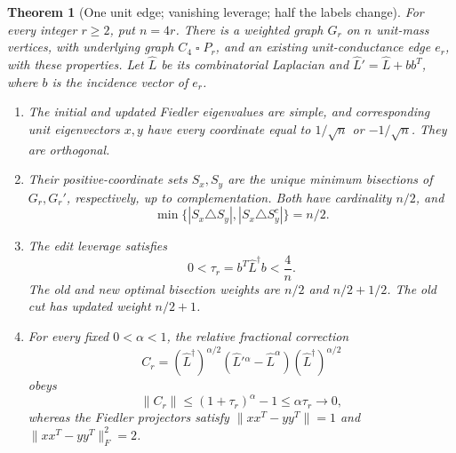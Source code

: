 \documentclass[11pt]{article}
\newtheorem{theorem}{Theorem}
\begin{document}
\begin{theorem}[One unit edge; vanishing leverage; half the labels change]
\label{thm:counter}
For every integer $r\ge2$, put $n=4r$. There is a weighted graph $G_r$
on $n$ unit-mass vertices, with underlying graph $C_4\mathbin\square P_r$,
and an existing unit-conductance edge $e_r$, with these properties.
Let $\widehat L$ be its combinatorial Laplacian and
$\widehat L'=\widehat L+bb^T$, where $b$ is the incidence vector of $e_r$.
\begin{enumerate}
\item The initial and updated Fiedler eigenvalues are simple, and
corresponding unit eigenvectors $x,y$ have every coordinate equal to
$1/\sqrt n$ or $-1/\sqrt n$. They are orthogonal.
\item Their positive-coordinate sets $S_x,S_y$ are the unique minimum
bisections of $G_r,G_r'$, respectively, up to complementation. Both
have cardinality $n/2$, and
\[
 \min\{|S_x\triangle S_y|,|S_x\triangle S_y^c|\}=n/2.
\]
\item The edit leverage satisfies
\[
 0<\tau_r=b^T\widehat L^\dagger b<\frac4n.
\]
The old and new optimal bisection weights are $n/2$ and $n/2+1/2$.
The old cut has updated weight $n/2+1$.
\item For every fixed $0<\alpha<1$, the relative fractional correction
\[
 C_r=(\widehat L^\dagger)^{\alpha/2}
       (\widehat L'{}^\alpha-\widehat L^\alpha)
       (\widehat L^\dagger)^{\alpha/2}
\]
obeys
\[
 \|C_r\|\le(1+\tau_r)^\alpha-1
 \le\alpha\tau_r\longrightarrow0,
\]
whereas the Fiedler projectors satisfy
$\|xx^T-yy^T\|=1$ and $\|xx^T-yy^T\|_F^2=2$.
\end{enumerate}
\end{theorem}
\end{document}
